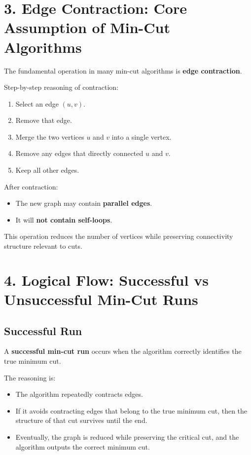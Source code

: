 \documentclass[12pt]{article}
\begin{document}
\section*{3. Edge Contraction: Core Assumption of Min-Cut Algorithms}

The fundamental operation in many min-cut algorithms is \textbf{edge contraction}.

Step-by-step reasoning of contraction:

\begin{enumerate}
\item Select an edge $(u, v)$.
\item Remove that edge.
\item Merge the two vertices $u$ and $v$ into a single vertex.
\item Remove any edges that directly connected $u$ and $v$.
\item Keep all other edges.
\end{enumerate}

After contraction:
\begin{itemize}
\item The new graph may contain \textbf{parallel edges}.
\item It will \textbf{not contain self-loops}.
\end{itemize}

This operation reduces the number of vertices while preserving connectivity structure relevant to cuts.

\section*{4. Logical Flow: Successful vs Unsuccessful Min-Cut Runs}

\subsection*{Successful Run}

A \textbf{successful min-cut run} occurs when the algorithm correctly identifies the true minimum cut.

The reasoning is:

\begin{itemize}
\item The algorithm repeatedly contracts edges.
\item If it avoids contracting edges that belong to the true minimum cut, then the structure of that cut survives until the end.
\item Eventually, the graph is reduced while preserving the critical cut, and the algorithm outputs the correct minimum cut.
\end{itemize}
\end{document}
